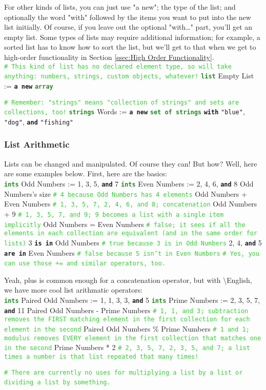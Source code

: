 \documentclass{article}
\newcommand{\English}{\textbackslash{}English}				%
\newcommand{\sssecl}[1]{\subsubsection{#1}\label{sssec:#1}}
\newcommand{\codecomment}[1]{\texttt{\textcolor{LimeGreen}{#1}}}
\newcommand{\commentline}[1]{\codecomment{\# #1}}
\newcommand{\type}[1]{\texttt{\textcolor{ForestGreen}{\textbf{#1}}}}
\newcommand{\common}[1]{\texttt{\textcolor{Mulberry}{\textbf{#1}}}}
\newcommand{\codestring}[1]{\texttt{\textcolor{NavyBlue}{"#1"}}}
\newenvironment{code}[0]
{\ttfamily{}				%
\setlength\parindent{0cm}	%
~\\}
{\setlength\parindent{1cm}
~\\}
\begin{document}
\indent For other kinds of lists, you can just use "a new"; the type of the list; and optionally the word "with" followed by the items you want to put into the new list initially. Of course, if you leave out the optional "with\ldots" part, you'll get an empty list. Some types of lists may require additional information; for example, a sorted list has to know how to sort the list, but we'll get to that when we get to high-order functionality in Section \ref{ssec:High Order Functionality}.
\begin{code}
\commentline{This kind of list has no declared element type, so will take anything: numbers, strings, custom objects, whatever!}
\type{list} Empty List := \common{a new} \type{array}

\commentline{Remember: "strings" means "collection of strings" and sets are collections, too!}
\type{strings} Words := \common{a new} \type{set of strings} \common{with} \codestring{blue}, \codestring{dog}, \common{and} \codestring{fishing}
\end{code}

\sssecl{List Arithmetic}
\indent Lists can be changed and manipulated. Of course they can! But how? Well, here are some examples below. First, here are the basics:
\begin{code}
\type{ints} Odd Numbers := 1, 3, 5, \common{and} 7
\type{ints} Even Numbers := 2, 4, 6, \common{and} 8
Odd Numbers's size \commentline{4 because Odd Numbers has 4 elements}
Odd Numbers + Even Numbers \commentline{1, 3, 5, 7, 2, 4, 6, and 8; concatenation}
Odd Numbers + 9 \commentline{1, 3, 5, 7, and 9; 9 becomes a list with a single item implicitly}
Odd Numbers = Even Numbers \commentline{false; it sees if all the elements in each collection are equivalent (and in the same order for lists)}
3 \common{is in} Odd Numbers \commentline{true because 3 is in Odd Numbers}
2, 4, \common{and} 5 \common{are in} Even Numbers \commentline{false because 5 isn't in Even Numbers}
\commentline{Yes, you can use those += and similar operators, too.}
\end{code}

\indent Yeah, plus is common enough for a concatenation operator, but with \English{}, we have more cool list arithmatic operators:
\begin{code}
\type{ints} Paired Odd Numbers := 1, 1, 3, 3, \common{and} 5
\type{ints} Prime Numbers := 2, 3, 5, 7, \common{and} 11
Paired Odd Numbers - Prime Numbers \commentline{1, 1, and 3; subtraction removes the FIRST matching element in the first collection for each element in the second}
Paired Odd Numbers \% Prime Numbers \commentline{1 and 1; modulus removes EVERY element in the first collection that matches one in the second}
Prime Numbers * 2 \commentline{2, 3, 5, 7, 2, 3, 5, and 7; a list times a number is that list repeated that many times!}

\commentline{There are currently no uses for multiplying a list by a list or dividing a list by something.}
\end{code}
\end{document}
